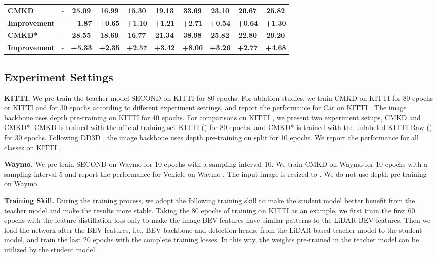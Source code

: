 \documentclass[runningheads]{llncs}
\begin{document}
\begin{table*}[t]
{\begin{tabular}{l|l|cccc|cccc}
    \midrule
    \textbf{CMKD} &\multicolumn{1}{c|}{-}   & \textbf{25.09}  & \textbf{16.99}  & \textbf{15.30}  & \textbf{19.13} & \textbf{33.69}  & \textbf{23.10}  & \textbf{20.67} & \textbf{25.82} \\
    \textbf{Improvement} &\multicolumn{1}{c|}{-}  &\textbf{+1.87}  & \textbf{+0.65}  &\textbf{+1.10} &\textbf{+1.21} &\textbf{+2.71}  &\textbf{+0.54}  &\textbf{+0.64} &\textbf{+1.30} \\
    \midrule
    \textbf{CMKD*} &\multicolumn{1}{c|}{-}   & \textbf{28.55}  & \textbf{18.69}  & \textbf{16.77}  & \textbf{21.34}& \textbf{38.98}  & \textbf{25.82}  & \textbf{22.80}  & \textbf{29.20}\\
    \textbf{Improvement} &\multicolumn{1}{c|}{-} &\textbf{+5.33}  & \textbf{+2.35}  &\textbf{+2.57} &\textbf{+3.42} &\textbf{+8.00}  &\textbf{+3.26}  &\textbf{+2.77}  &\textbf{+4.68}\\
    \bottomrule
    \end{tabular}
    }
    \label{tab:car}
\end{table*}


\subsection{Experiment Settings}
\textbf{KITTI.}
We pre-train the teacher model SECOND \cite{second} on KITTI  for 80 epochs.
For ablation studies, we train CMKD on KITTI  for 80 epochs or KITTI  and  for 30 epochs according to different experiment settings, and report the performance for Car on KITTI .
The image backbone uses depth pre-training on KITTI  for 40 epochs.
For comparisons on KITTI , we present two experiment setups, CMKD and CMKD*.
CMKD is trained with the official training set KITTI  () for 80 epochs,
and CMKD* is trained with the unlabeled KITTI Raw () for 30 epochs.
Following DD3D \cite{dd3d}, the image backbone uses depth pre-training on  split for 10 epochs.
We report the performance for all classes on KITTI . 

\noindent\textbf{Waymo.} We pre-train SECOND \cite{second} on Waymo  for 10 epochs with a sampling interval 10. 
We train CMKD on Waymo  for 10 epochs with a sampling interval 5 and report the performance for Vehicle on Waymo . 
The input image is resized to . We do not use depth pre-training on Waymo.

\noindent\textbf{Training Skill.} 
During the training process, we adopt the following training skill to make the student model better benefit from the teacher model and make the results more stable.
Taking the 80 epochs of training on KITTI  as an example, we first train the first 60 epochs with the feature distillation loss  only to make the image BEV features have similar patterns to the LiDAR BEV features.
Then we load the network after the BEV features, i.e., BEV backbone and detection heads, from the LiDAR-based teacher model to the student model, and train the last 20 epochs with the complete training losses. 
In this way, the weights pre-trained in the teacher model can be utilized by the student model. 
\end{document}
